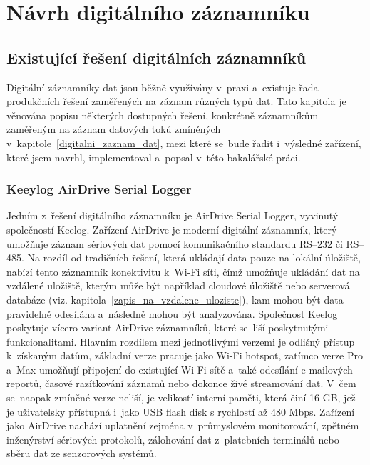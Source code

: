 \chapter{Návrh digitálního záznamníku}
\label{navrh_digitalniho_zaznamniku}

\section{Existující řešení digitálních záznamníků}
\label{existujici_reseni}
Digitální záznamníky dat jsou běžně využívány v~praxi a~existuje řada produkčních řešení zaměřených na záznam různých typů dat. Tato kapitola je věnována popisu některých dostupných řešení, konkrétně záznamníkům zaměřeným na záznam datových toků zmíněných v~kapitole~\ref{digitalni_zaznam_dat}, mezi které se~bude řadit i~výsledné zařízení, které jsem navrhl, implementoval a~popsal v~této bakalářské práci. 

\subsection{Keeylog AirDrive Serial Logger}
\label{keelog_airdrive_serial_datalogger}
Jedním z~řešení digitálního záznamníku je AirDrive Serial Logger, vyvinutý společností Keelog. Zařízení AirDrive je moderní digitální záznamník, který umožňuje záznam sériových dat pomocí komunikačního standardu RS--232 či RS--485. Na rozdíl od tradičních řešení, která ukládají data pouze na lokální úložiště, nabízí tento záznamník konektivitu k~Wi-Fi síti, čímž umožňuje ukládání dat na vzdálené uložiště, kterým může být například cloudové úložiště nebo serverová databáze (viz. kapitola~\ref{zapis_na_vzdalene_uloziste}), kam mohou být data pravidelně odesílána a~následně mohou být analyzována. Společnost Keelog poskytuje vícero variant AirDrive záznamníků, které se~liší poskytnutými funkcionalitami. Hlavním rozdílem mezi jednotlivými verzemi je odlišný přístup k~získaným datům, základní verze pracuje jako Wi-Fi hotspot, zatímco verze Pro a~Max umožňují připojení do existující Wi-Fi sítě a~také odesílání e-mailových reportů, časové razítkování záznamů nebo dokonce živé streamování dat. V~čem se~naopak zmíněné verze neliší, je velikostí interní paměti, která činí 16 GB, jež je uživatelsky přístupná i~jako USB flash disk s rychlostí až 480 Mbps. Zařízení jako AirDrive nachází uplatnění zejména v~průmyslovém monitorování, zpětném inženýrství sériových protokolů, zálohování dat z~platebních terminálů nebo sběru dat ze senzorových systémů.~\cite{keelog_airdrive_serial_datalogger, keelog_airdrive_serial_datalogger_max, keelog_airdrive_serial_datalogger_pro}



